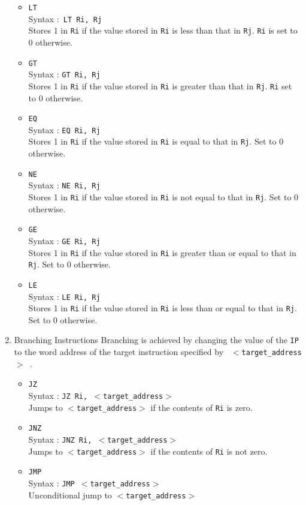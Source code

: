 \documentclass[11pt]{report}
\begin{document}
\begin{enumerate}
\begin{itemize}
\item \texttt{LT}\\
Syntax :\texttt{ LT Ri, Rj}\\
Stores 1 in \texttt{Ri} if the value stored in \texttt{Ri} is less than that in \texttt{Rj}. \texttt{Ri} is set to 0 otherwise. 

\item \texttt{GT}\\
Syntax : \texttt{GT Ri, Rj}\\
Stores 1 in \texttt{Ri} if the value stored in \texttt{Ri} is greater than that in \texttt{Rj}. \texttt{Ri} set to 0 otherwise. 

\item \texttt{EQ}\\
Syntax : \texttt{EQ Ri, Rj}\\
Stores 1 in \texttt{Ri} if the value stored in \texttt{Ri} is equal to that in \texttt{Rj}. Set to 0 otherwise. 

\item \texttt{NE}\\
Syntax : \texttt{NE Ri, Rj}\\
Stores 1 in \texttt{Ri} if the value stored in \texttt{Ri} is not equal to that in \texttt{Rj}. Set to 0 otherwise. 

\item \texttt{GE} \\
Syntax : \texttt{GE Ri, Rj} \\
Stores 1 in \texttt{Ri} if the value stored in \texttt{Ri} is greater than or equal to that in \texttt{Rj}. Set to 0 otherwise. 

\item \texttt{LE}\\
Syntax : \texttt{LE Ri, Rj}\\
Stores 1 in \texttt{Ri} if the value stored in \texttt{Ri} is less than or equal to that in \texttt{Rj}. Set to 0 otherwise. 
\end{itemize}


\item Branching Instructions
Branching is achieved by changing the value of the \texttt{IP} to the word address of the target instruction specified by \texttt{ $<$target\_address$>$ }. 
 
\begin{itemize}
\item \texttt{JZ}\\
Syntax : \texttt{JZ Ri, $<$target\_address$>$}\\
Jumps to \texttt{$<$target\_address$>$} if the contents of \texttt{Ri} is zero.
\item \texttt{JNZ}\\
Syntax : \texttt{JNZ Ri, $<$target\_address$>$}\\
Jumps to \texttt{$<$target\_address$>$} if the contents of \texttt{Ri} is not zero.
\item \texttt{JMP}\\
Syntax : \texttt{JMP $<$target\_address$>$}\\
Unconditional jump to \texttt{$<$target\_address$>$}\\


\end{itemize}
\end{enumerate}
\end{document}
